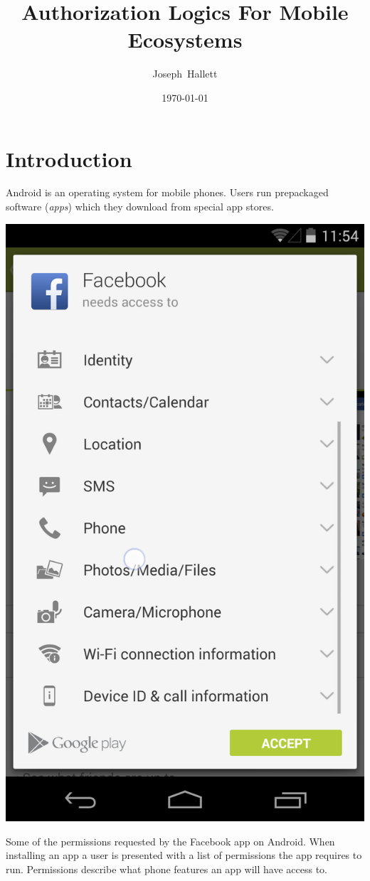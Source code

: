 \documentclass[a4paper,sfsidenotes]{%
  article%
}
\title{Authorization Logics For Mobile Ecosystems}%
\author{Joseph~Hallett}
\date\today
\begin{document}
\frenchspacing
\maketitle
\setcounter{tocdepth}{3}
\tableofcontents
\pagebreak

\section{Introduction}
\label{sec:intro}

Android is an operating system for mobile phones.  Users run prepackaged
software (\emph{apps}) which they download from special app stores.

\begin{marginfigure}
  \includegraphics[width=\smallmarginlength]{img/facebookperms2.png}
  \caption{Some of the permissions requested by the Facebook app on Android.
  When installing an app a user is presented with a list of permissions the app
requires to run.  Permissions describe what phone features an app will have
access to.}
  \label{fig:fb}
\end{marginfigure}
\end{document}
